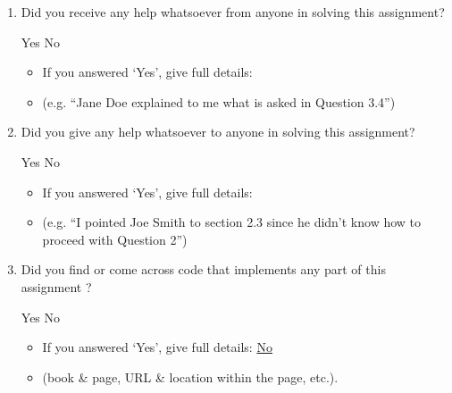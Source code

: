 \documentclass[11pt,addpoints,answers]{exam}
\numberwithin{equation}{section} %
\numberwithin{figure}{section} %
\numberwithin{table}{section} %
\begin{document}
\begin{enumerate}
    \item Did you receive any help whatsoever from anyone in solving this assignment?
    \begin{checkboxes}
     \choice Yes
     \choice No
    \end{checkboxes}
    \begin{itemize}
        \item If you answered `Yes', give full details:
        \item (e.g. “Jane Doe explained to me what is asked in Question 3.4”)
    \end{itemize}

    \begin{tcolorbox}[fit,height=3cm,blank, borderline={1pt}{-2pt},nobeforeafter]
    \end{tcolorbox}

    \item Did you give any help whatsoever to anyone in solving this assignment?
    \begin{checkboxes}
     \choice Yes
     \choice No
    \end{checkboxes}
    \begin{itemize}
        \item If you answered `Yes', give full details:
        \item (e.g. “I pointed Joe Smith to section 2.3 since he didn’t know how to proceed with Question 2”)
    \end{itemize}

    \begin{tcolorbox}[fit,height=3cm,blank, borderline={1pt}{-2pt},nobeforeafter]
    \end{tcolorbox}

    \item Did you find or come across code that implements any part of this assignment ? 
    \begin{checkboxes}
     \choice Yes
     \choice No
    \end{checkboxes}
    \begin{itemize}
        \item If you answered `Yes', give full details: \underline{No}
        \item (book \& page, URL \& location within the page, etc.).
    \end{itemize}
    \begin{tcolorbox}[fit,height=3cm,blank, borderline={1pt}{-2pt},nobeforeafter]
    \end{tcolorbox}
\end{enumerate}
\end{document}
